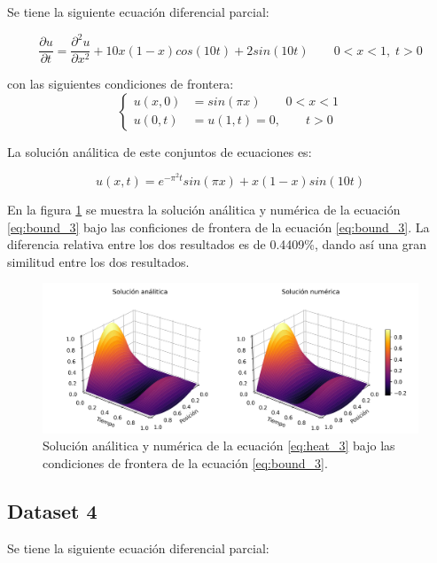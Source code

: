 Se tiene la siguiente ecuación diferencial parcial:

\begin{equation}
	\frac{\partial u}{\partial t} = \frac{\partial^2 u}{\partial x^2}+10x(1-x)cos(10t)+2sin(10t)\qquad 0<x<1, \; t>0 \label{eq:heat_3}
\end{equation}

con las siguientes condiciones de frontera:
\begin{equation}
	\begin{cases}
		u(x,0) & = sin(\pi x) \qquad 0<x<1 \\
		u(0,t) & =u(1,t) = 0, \qquad t>0
	\end{cases} \label{eq:bound_3}
\end{equation}

La solución análitica de este conjuntos de ecuaciones es:

\begin{equation}
	u(x,t)= e^{-\pi^2 t}sin(\pi x)+x(1-x)sin(10t) \label{eq:sol_3}
\end{equation}

En la figura \ref{fig:sol_3} se muestra la solución análitica y numérica de la ecuación \ref{eq:bound_3} bajo las conficiones de frontera de la ecuación \ref{eq:bound_3}. La diferencia relativa entre los dos resultados es de 0.4409\%, dando así una gran similitud entre los dos resultados.

\begin{figure}[H]
	\centering
	\includegraphics[width=17cm]{Graphics/surface_3.png}
	\caption{Solución análitica y numérica de la ecuación \ref{eq:heat_3} bajo las condiciones de frontera de la ecuación \ref{eq:bound_3}.}
	\label{fig:sol_3}
\end{figure}

\subsection{Dataset 4}

Se tiene la siguiente ecuación diferencial parcial:

